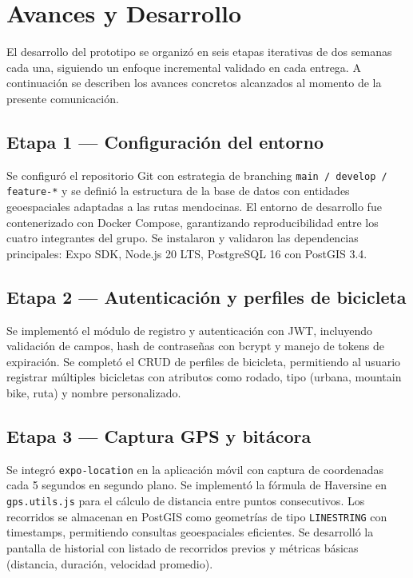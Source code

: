 \documentclass{llncs}
\begin{document}
\section{Avances y Desarrollo}

El desarrollo del prototipo se organizó en seis etapas iterativas de dos semanas cada una, siguiendo un enfoque incremental validado en cada entrega. A continuación se describen los avances concretos alcanzados al momento de la presente comunicación.

\subsection{Etapa 1 — Configuración del entorno}

Se configuró el repositorio Git con estrategia de branching \texttt{main / develop / feature-*} y se definió la estructura de la base de datos con entidades geoespaciales adaptadas a las rutas mendocinas. El entorno de desarrollo fue contenerizado con Docker Compose, garantizando reproducibilidad entre los cuatro integrantes del grupo. Se instalaron y validaron las dependencias principales: Expo SDK, Node.js 20 LTS, PostgreSQL 16 con PostGIS 3.4.

\subsection{Etapa 2 — Autenticación y perfiles de bicicleta}

Se implementó el módulo de registro y autenticación con JWT, incluyendo validación de campos, hash de contraseñas con bcrypt y manejo de tokens de expiración. Se completó el CRUD de perfiles de bicicleta, permitiendo al usuario registrar múltiples bicicletas con atributos como rodado, tipo (urbana, mountain bike, ruta) y nombre personalizado.

\subsection{Etapa 3 — Captura GPS y bitácora}

Se integró \texttt{expo-location} en la aplicación móvil con captura de coordenadas cada 5 segundos en segundo plano. Se implementó la fórmula de Haversine en \texttt{gps.utils.js} para el cálculo de distancia entre puntos consecutivos. Los recorridos se almacenan en PostGIS como geometrías de tipo \texttt{LINESTRING} con timestamps, permitiendo consultas geoespaciales eficientes. Se desarrolló la pantalla de historial con listado de recorridos previos y métricas básicas (distancia, duración, velocidad promedio).
\end{document}
